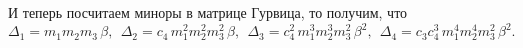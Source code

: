 И теперь посчитаем миноры в матрице Гурвица, то получим, что
\begin{equation*}
    \Delta_1 = m_1 m_2 m_3 \, \beta, \ \ 
    \Delta_2 = c_4 \, m_1^2 m_2^2 m_3^2 \, \beta, \ \ 
    \Delta_3 = c_4^2 \, m_1^3 m_2^3 m_3^2 \, \beta^2, \ \ 
    \Delta_4 = c_3  c_4^3 \, m_1^4  m_2^4 m_3^2 \, \beta^2.
\end{equation*}




